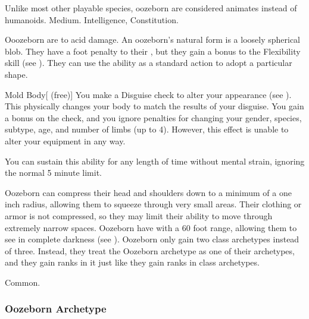          Unlike most other playable species, oozeborn are considered animates instead of humanoids.
         Medium.
          Intelligence,  Constitution.
        \begin{itemize}
             Ooozeborn are  to acid damage.
             An oozeborn's natural form is a loosely spherical blob.
                They have a  foot penalty to their , but they gain a  bonus to the Flexibility skill (see ).
                They can use the  ability as a standard action to adopt a particular shape.
                \begin{durationability}{Mold Body}[ (free)]
                    You make a Disguise check to alter your appearance (see ).
                    This physically changes your body to match the results of your disguise.
                    You gain a  bonus on the check, and you ignore penalties for changing your gender, species, subtype, age, and number of limbs (up to 4).
                    However, this effect is unable to alter your equipment in any way.

                    You can sustain this ability for any length of time without mental strain, ignoring the normal 5 minute limit.
                \end{durationability}
             Oozeborn can compress their head and shoulders down to a minimum of a one inch radius, allowing them to squeeze through very small areas.
                Their clothing or armor is not compressed, so they may limit their ability to move through extremely narrow spaces.
             Oozeborn have  with a 60 foot range, allowing them to see in complete darkness (see ).
             Oozeborn only gain two class archetypes instead of three.
                Instead, they treat the Oozeborn archetype as one of their archetypes, and they gain ranks in it just like they gain ranks in class archetypes.
        \end{itemize}
         Common.
        
        \subsubsection{Oozeborn Archetype}

